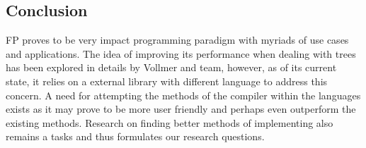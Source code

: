 \subsection{Conclusion}
FP proves to be very impact programming paradigm with myriads of use cases and applications. The idea of improving its performance when dealing with trees has been explored in details by Vollmer and team, however, as of its current state, it relies on a external library with different language to address this concern. A need for attempting the methods of the compiler within the languages exists as it may prove to be more user friendly and perhaps even outperform the existing methods. Research on finding better methods of implementing also remains a tasks and thus formulates our research questions.
